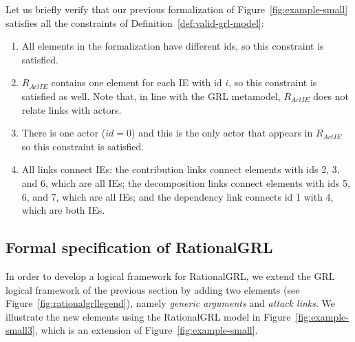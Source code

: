 Let us briefly verify that our previous formalization of Figure~\ref{fig:example-small} satisfies all the constraints of Definition~\ref{def:valid-grl-model}:
\begin{enumerate}
\item All elements in the formalization have different ids, so this constraint is satisfied.
\item $R_{ActIE}$ contains one element for each IE with id $i$, so this constraint is satisfied as well. Note that, in line with the GRL metamodel, $R_{ActIE}$ does not relate links with actors. 
\item There is one actor ($id=0$) and this is the only actor that appears in $R_{ActIE}$ so this constraint is satisfied.
\item All links connect IEs: the contribution links connect elements with ids 2, 3, and 6, which are all IEs; the decomposition links connect elements with ids 5, 6, and 7, which are all IEs; and the dependency link connects id 1 with 4, which are both IEs.
\end{enumerate}

\subsection{Formal specification of RationalGRL}
\label{sect:formalframework:rationalgrl}

In order to develop a logical framework for RationalGRL, we extend the GRL logical framework of the previous section by adding two elements (see Figure~\ref{fig:rationalgrllegend}), namely \emph{generic arguments} and \emph{attack links}. We illustrate the new elements using the RationalGRL model in Figure~\ref{fig:example-small3}, which is an extension of Figure~\ref{fig:example-small}. 

